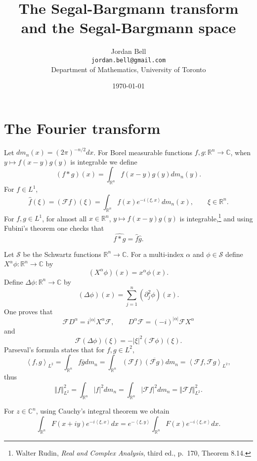 \documentclass{article}
\newcommand{\inner}[2]{\left\langle #1, #2 \right\rangle}
\newcommand{\norm}[1]{\left\Vert #1 \right\Vert}
\theoremstyle{definition}
\begin{document}
\title{The Segal-Bargmann transform and the Segal-Bargmann space}
\author{Jordan Bell\\ \texttt{jordan.bell@gmail.com}\\Department of Mathematics, University of Toronto}
\date{\today}

\maketitle

\section{The Fourier transform}
Let $dm_n(x) = (2\pi)^{-n/2} dx$. 
For Borel measurable functions $f,g:\mathbb{R}^n \to \mathbb{C}$, when $y \mapsto f(x-y) g(y)$ is integrable we define
\[
(f*g)(x) = \int_{\mathbb{R}^n} f(x-y) g(y) dm_n(y).
\]
For $f \in L^1$,
\[
\hat{f}(\xi) = (\mathscr{F}f)(\xi) = \int_{\mathbb{R}^n} f(x) e^{-i\inner{\xi}{x}} dm_n(x),
\qquad \xi \in \mathbb{R}^n.
\]
For $f,g \in L^1$, for almost all $x \in \mathbb{R}^n$, $y \mapsto f(x-y) g(y)$ is integrable,\footnote{Walter Rudin,
{\em Real and Complex Analysis}, third ed., p.~170, Theorem 8.14.}
and using Fubini's theorem one checks that
\[
\widehat{f*g}=\widehat{f} \widehat{g}.
\]

Let $\mathscr{S}$ be the Schwartz functions 
$\mathbb{R}^n \to \mathbb{C}$. 
For a multi-index $\alpha$ and $\phi \in \mathscr{S}$
define $X^\alpha \phi:\mathbb{R}^n \to \mathbb{C}$ by
\[
(X^\alpha \phi)(x) = x^\alpha \phi(x).
\]
Define $\Delta \phi:\mathbb{R}^n \to \mathbb{C}$ by
\[
(\Delta \phi)(x) = \sum_{j=1}^n (\partial_j^2 \phi)(x).
\]
One proves that 
\[
\mathscr{F} D^\alpha = i^{|\alpha|} X^\alpha \mathscr{F},
\qquad D^\alpha \mathscr{F} = (-i)^{|\alpha|} \mathscr{F} X^\alpha
\]
and
\[
\mathscr{F}(\Delta \phi)(\xi) = -|\xi|^2 (\mathscr{F}\phi)(\xi).
\]
Parseval's formula states that for $f,g \in L^2$,
\[
\inner{f}{g}_{L^2}=\int_{\mathbb{R}^n} f \overline{g} dm_n = \int_{\mathbb{R}^n} (\mathscr{F} f)\overline{(\mathscr{F}g)} dm_n=
\inner{\mathscr{F}f}{\mathscr{F}g}_{L^2},
\]
thus
\[
\norm{f}_{L^2}^2 = \int_{\mathbb{R}^n} |f|^2 dm_n
=\int_{\mathbb{R}^n} |\mathscr{F} f|^2 dm_n = \norm{\mathscr{F}f}_{L^2}^2.
\]


For $z \in \mathbb{C}^n$, using Cauchy's integral theorem we obtain
\begin{equation}
\int_{\mathbb{R}^n} F(x+iy) e^{-i\inner{\xi}{x}} dx=
e^{-\inner{\xi}{y}} \int_{\mathbb{R}^n} F(x) e^{-i\inner{\xi}{x}} dx.
\label{contours}
\end{equation}
\end{document}
